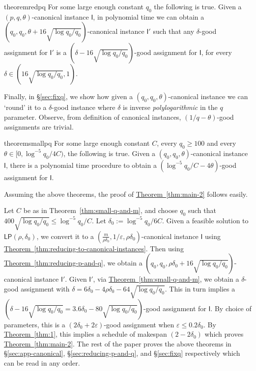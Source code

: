 \documentclass[11pt]{article}
\newenvironment{proofof}[1]{\rm \trivlist \item[\hskip \labelsep{\it #1.\/}]}{\outerparskip 0pt\endtrivlist}
\newenvironment{proofof}[1]{\begin{proof}[#1]}{\end{proof}}
\newcommand{\cI}{{\mathsf I}}
\newcommand{\eps}{\varepsilon}
\renewcommand{\epsilon}{\varepsilon}
\newcommand{\LP}{{\mathsf{LP}}}
\renewcommand{\epsilon}{\varepsilon}
\newcommand{\Sec}[1]{\texorpdfstring{\hyperref[sec:#1]{\S\ref*{sec:#1}}}{\S\ref*{sec:#1}}} \newcommand{\Eqn}[1]{\texorpdfstring{\hyperref[eq:#1]{(\ref*{eq:#1})}}{(\ref*{eq:#1})}} \newcommand{\Thm}[1]{\texorpdfstring{\hyperref[thm:#1]{Theorem~\ref*{thm:#1}}}{Theorem~\ref*{thm:#1}}} \newcommand{\Lem}[1]{\texorpdfstring{\hyperref[lem:#1]{Lemma~\ref*{lem:#1}}}{Lemma~\ref*{lem:#1}}} \newcommand{\Def}[1]{\texorpdfstring{\hyperref[def:#1]{Definition~\ref*{def:#1}}}{Definition~\ref*{def:#1}}} \newcommand{\Clm}[1]{\texorpdfstring{\hyperref[clm:#1]{Claim~\ref*{clm:#1}}}{Claim~\ref*{clm:#1}}} \newcommand{\App}[1]{\hyperref[app:#1]{Appendix~\ref*{app:#1}}}
\begin{document}
\begin{restatable}{theorem}{redpq}
\label{thm:reducing-p-and-q}\label{thm:2}
For some large enough constant $q_0$ the following is true. Given a $(p,q,\theta)$-canonical instance $\cI$, in polynomial time we can obtain a $(q_0,q_0,\theta + 16\sqrt{\log q_0/q_0})$-canonical instance $\cI'$ such that any $\delta$-good assignment for $\cI'$ is a $(\delta - 16\sqrt{\log q_0/q_0})$-good assignment for $\cI$, for every $\delta  \in (16\sqrt{\log q_0/q_0}, 1)$.
\end{restatable}
\noindent
Finally, in \Sec{fixq}, we show how given a $(q_0,q_0,\theta)$-canonical instance we can `round' it to a $\delta$-good instance where $\delta$ is inverse {\em polylogarithmic} in the $q$ parameter. Observe, from definition of canonical instances, $(1/q-\theta)$-good assignments are trivial.

\begin{restatable}{theorem}{smallpq}
\label{thm:small-q-and-m}
For some large enough constant $C$, every $q_0 \geq 100$ and every $\theta \in [0, \log^{-5}q_0/4C)$, the following is true. Given a $(q_0,q_0,\theta)$-canonical instance $\cI$, there is a polynomial time procedure  to obtain a $(\log^{-5}q_0/C - 4\theta)$-good assignment for $\cI$.
\end{restatable}
\noindent
Assuming the above theorems, the proof of \Thm{main-2} follows easily.
\begin{proofof}{\bf Proof of Theorem \ref{thm:main-2}} Let $C$ be as in Theorem~\ref{thm:small-q-and-m}, and choose $q_0$  such that $400\sqrt{\log q_0/q_0} \leq   \log^{-5}q_0/C$. Let $\delta_0 := \log^{-5}q_0/6C$. Given a feasible solution to $\LP(\rho,\delta_0)$, we convert it to a $(\frac{m}{\rho\delta_0},1/\epsilon, \rho\delta_0)$-canonical instance $\cI$ using \Thm{reducing-to-canonical-instances}. Then using \Thm{reducing-p-and-q}, we obtain a $(q_0,q_0,\rho\delta_0 + 16\sqrt{\log q_0/q_0})$-canonical instance $\cI'$. Given $\cI'$, via \Thm{small-q-and-m}, we obtain a $\delta$-good assignment with $\delta =  6\delta_0  - 4\rho\delta_0 - 64\sqrt{\log q_0/q_0}$. This in turn implies a  $(\delta - 16\sqrt{\log q_0/q_0} = 3.6\delta_0-80\sqrt{\log q_0/q_0})$-good assignment for $\cI$. By choice of parameters, this is a $(2\delta_0 + 2\eps)$-good assignment when $\eps \leq 0.2\delta_0$.
By \Thm{1}, this implies a schedule of makespan $(2-2\delta_0)$ which proves \Thm{main-2}.
\end{proofof}
\noindent
The rest of the paper proves the above theorems in \Sec{app-canonical}, \Sec{reducing-p-and-q}, and \Sec{fixq} respectively which can be read in any order.
\end{document}
